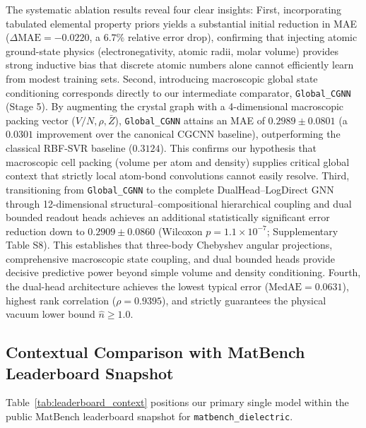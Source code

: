\documentclass[final,3p,times]{elsarticle}
\begin{document}
The systematic ablation results reveal four clear insights:
First, incorporating tabulated elemental property priors yields a substantial initial reduction in MAE ($\Delta\mathrm{MAE} = -0.0220$, a $6.7\%$ relative error drop), confirming that injecting atomic ground-state physics (electronegativity, atomic radii, molar volume) provides strong inductive bias that discrete atomic numbers alone cannot efficiently learn from modest training sets.
Second, introducing macroscopic global state conditioning corresponds directly to our intermediate comparator, \texttt{Global\_CGNN} (Stage 5). By augmenting the crystal graph with a 4-dimensional macroscopic packing vector ($V/N, \rho, \bar{Z}$), \texttt{Global\_CGNN} attains an MAE of $0.2989 \pm 0.0801$ (a $0.0301$ improvement over the canonical CGCNN baseline), outperforming the classical RBF-SVR baseline ($0.3124$). This confirms our hypothesis that macroscopic cell packing (volume per atom and density) supplies critical global context that strictly local atom-bond convolutions cannot easily resolve.
Third, transitioning from \texttt{Global\_CGNN} to the complete DualHead--LogDirect GNN through 12-dimensional structural--compositional hierarchical coupling and dual bounded readout heads achieves an additional statistically significant error reduction down to $0.2909 \pm 0.0860$ (Wilcoxon $p = 1.1 \times 10^{-7}$; Supplementary Table S8). This establishes that three-body Chebyshev angular projections, comprehensive macroscopic state coupling, and dual bounded heads provide decisive predictive power beyond simple volume and density conditioning.
Fourth, the dual-head architecture achieves the lowest typical error ($\mathrm{MedAE} = 0.0631$), highest rank correlation ($\rho = 0.9395$), and strictly guarantees the physical vacuum lower bound $\hat{n} \ge 1.0$.

\subsection{Contextual Comparison with MatBench Leaderboard Snapshot}
Table~\ref{tab:leaderboard_context} positions our primary single model within the public MatBench leaderboard snapshot for \texttt{matbench\_dielectric}.
\end{document}

